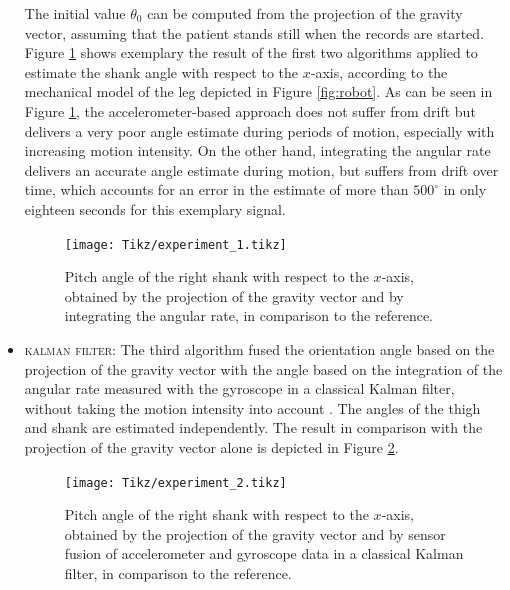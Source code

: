 \begin{itemize}
  \noindent The initial value $\theta_{0}$ can be computed from the projection of the gravity vector, assuming that the patient stands still when the records are started. Figure \ref{fig:experiment_1} shows exemplary the result of the first two algorithms applied to estimate the shank angle with respect to the $x$-axis, according to the mechanical model of the leg depicted in Figure \ref{fig:robot}. As can be seen in Figure \ref{fig:experiment_1}, the accelerometer-based approach does not suffer from drift but delivers a very poor angle estimate during periods of motion, especially with increasing motion intensity. On the other hand, integrating the angular rate delivers an accurate angle estimate during motion, but suffers from drift over time, which accounts for an error in the estimate of more than $500^{\circ}$ in only eighteen seconds for this exemplary signal.
    
\begin{figure}
	\centering
	\newlength\figureheight 
	\newlength\figurewidth 
	\setlength\figureheight{7cm} 
	\setlength\figurewidth{\textwidth}
	\texttt{[image: Tikz/experiment\_1.tikz]}
	\caption{Pitch angle of the right shank with respect to the $x$-axis, obtained by the projection of the gravity vector and by integrating the angular rate, in comparison to the reference.}
	\label{fig:experiment_1}
\end{figure}
  
  \item \textsc{kalman filter:} The third algorithm fused the orientation angle based on the projection of the gravity vector with the angle based on the integration of the angular rate measured with the gyroscope in a classical Kalman filter, without taking the motion intensity into account \cite{olivares_vicente_gaitwatch_2013}. The angles of the thigh and shank are estimated independently. The result in comparison with the projection of the gravity vector alone is depicted in Figure \ref{fig:experiment_2}.

\begin{figure}
	\centering
	\setlength\figureheight{7cm} 
	\setlength\figurewidth{\textwidth}
	\texttt{[image: Tikz/experiment\_2.tikz]}
	\caption{Pitch angle of the right shank with respect to the $x$-axis, obtained by the projection of the gravity vector and by sensor fusion of accelerometer and gyroscope data in a classical Kalman filter, in comparison to the reference.}
	\label{fig:experiment_2}
\end{figure}
  

\end{itemize}
